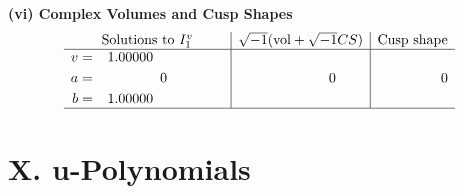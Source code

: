 \documentclass[1p]{elsarticle_modified}
\theoremstyle{definition}
\newcommand{\I}{\sqrt{-1}}
\begin{document}
\newpage\flushleft \textbf{(vi) Complex Volumes and Cusp Shapes}
$$\begin{array}{c|c|c}  
\text{Solutions to }I^v_{1}& \I (\text{vol} + \sqrt{-1}CS) & \text{Cusp shape}\\
 \hline 
\begin{aligned}
v &= \phantom{-}1.00000\phantom{ +0.000000I} \\
a &= \phantom{-0.000000 } 0 \\
b &= \phantom{-}1.00000\phantom{ +0.000000I}\end{aligned}
 & \phantom{-0.000000 } 0 & \phantom{-0.000000 } 0\\
 \hline 
 \end{array}$$\newpage
\newpage\renewcommand{\arraystretch}{1}
\centering \section*{ X. u-Polynomials}
\end{document}
